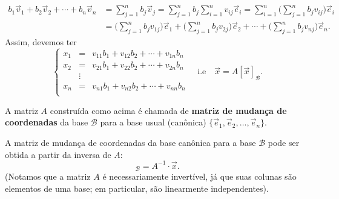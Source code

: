 \begin{align*}
b_1 \vec{v}_1 + b_2 \vec{v}_2 + \cdots + b_n \vec{v}_n & = \sum_{j=1}^{n} b_j \vec{v}_j = \sum_{j=1}^{n} b_j \sum_{i=1}^{n} v_{ij} \vec{e}_i  = \sum_{i=1}^{n} \bigg(\sum_{j=1}^{n} b_j v_{ij}\bigg) \vec{e}_i \\
& = \bigg(\sum_{j=1}^{n} b_j v_{1j}\bigg) \vec{e}_1 + \bigg(\sum_{j=1}^{n} b_j v_{2j}\bigg) \vec{e}_2 + \cdots + \bigg(\sum_{j=1}^{n} b_j v_{nj}\bigg) \vec{e}_n.
\end{align*}
Assim, devemos ter
\begin{equation}
\left\{
\begin{array}{lcl}
x_1 &=& v_{11} b_{1} + v_{12} b_{2} + \cdots + v_{1n} b_{n} \\
x_2 &=& v_{21} b_{1} + v_{22} b_{2} + \cdots + v_{2n} b_{n} \\
&\vdots& \\
x_n &=& v_{n1} b_{1} + v_{n2} b_{2} + \cdots + v_{nn} b_{n} \\
\end{array}
\right. \quad \text{i.e} \quad \vec{x} = A [\vec{x}]_{\mathcal{B}}.
\end{equation}

A matriz $A$ construída como acima é chamada de \textbf{matriz de mudança de coordenadas} da base $\mathcal{B}$ para a base usual (canônica) $\{ \vec{e}_1, \vec{e}_2, \dots, \vec{e}_n\}$.

A matriz de mudança de coordenadas da base canônica para a base $\mathcal{B}$ pode ser obtida a partir da inversa de $A$:
\begin{equation}
[\vec{x}]_{\mathcal{B}} = A^{-1} \cdot \vec{x}.
\end{equation} (Notamos que a matriz $A$ é necessariamente invertível, já que suas colunas são elementos de uma base; em particular, são linearmente independentes).

